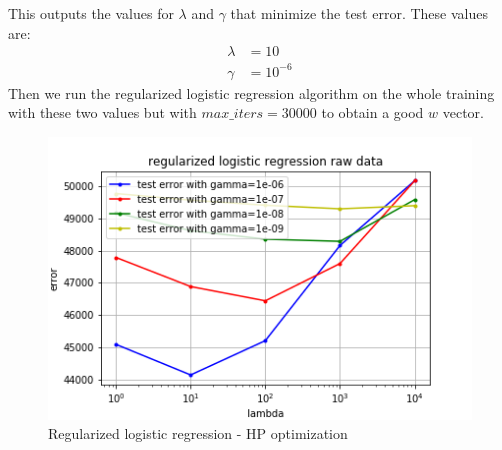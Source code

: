 \documentclass[11pt, a4paper, twoside]{article}
\begin{document}
This outputs the values for $\lambda$ and $\gamma$ that minimize the test error. These values are:
\begin{align*}
  \lambda &= 10 \\
  \gamma &= 10^{-6}
\end{align*}
Then we run the regularized logistic regression algorithm on the whole training with these two values but with $max\_iters = 30000$ to obtain a good $w$ vector.

\begin{figure}[h!]
  \includegraphics[width=0.5\linewidth]{plots/raw_data_reg_log_regr.png}
  \caption{Regularized logistic regression - HP optimization}
  \label{fig:raw_reg_log_regr}
\end{figure}
\end{document}
